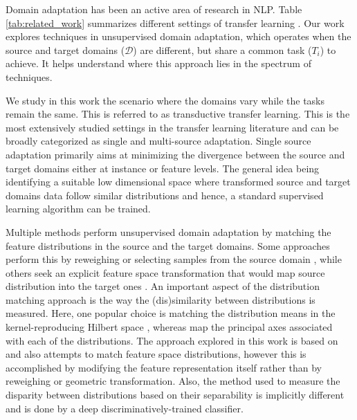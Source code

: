 \documentclass{sigkddExp}
\begin{document}
Domain adaptation has been an active area of research in NLP. Table \ref{tab:related_work}  summarizes different settings of transfer learning \cite{pan2010survey}. Our work explores techniques in unsupervised domain adaptation, which operates when the source and target domains ($\mathcal{D}$) are different, but share a common task ($T_i$) to achieve. It helps understand where this approach lies in the spectrum of techniques. 

We study in this work the scenario where the domains vary while the tasks remain the same. This is referred to as transductive transfer learning. This is the most extensively studied settings in the transfer learning literature and can be broadly categorized as single and multi-source adaptation. Single source adaptation\cite{chen2009extracting, ando2005framework, daume2009frustratingly} primarily aims at minimizing the divergence between the source and target domains either at instance or feature levels. The general idea being identifying a suitable low dimensional space where transformed source and target domains data follow similar distributions and hence, a standard supervised learning algorithm can be trained.

Multiple methods perform unsupervised domain adaptation by matching the feature distributions in the source and the target domains. Some approaches perform this by reweighing or selecting samples from the source domain  \cite{borgwardt2006integrating, huang2007correcting, gong2012geodesic}, while others seek an explicit feature space transformation that would map source distribution into the target ones \cite{pan2011domain, gopalan2011domain, baktashmotlagh2013unsupervised}. An important  aspect of the distribution matching approach is the way the (dis)similarity between distributions is measured. Here, one popular choice is matching the distribution means in the kernel-reproducing Hilbert space \cite{borgwardt2006integrating, huang2007correcting}, whereas \cite{gong2012geodesic, fernando2013unsupervised} map the principal axes associated with each of the distributions. The approach explored in this work is based on \cite{ganin2015unsupervised} and also attempts to match feature space distributions, however this is accomplished by modifying the feature representation itself rather than by reweighing or geometric transformation. Also, the method used to measure the disparity between distributions based on their separability is implicitly different and is done by a deep discriminatively-trained classifier.
\end{document}
